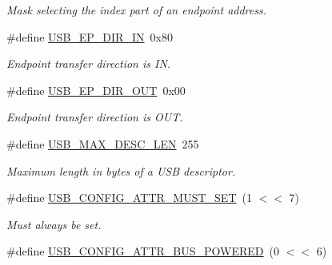 \begin{DoxyCompactItemize}
\begin{DoxyCompactList}\small\item\em Mask selecting the index part of an endpoint address. \end{DoxyCompactList}\item 
\hypertarget{group__usb__protocol__group_gaae8411e95f26738326bc25a0161dde99}{\#define \hyperlink{group__usb__protocol__group_gaae8411e95f26738326bc25a0161dde99}{U\-S\-B\-\_\-\-E\-P\-\_\-\-D\-I\-R\-\_\-\-I\-N}~0x80}\label{group__usb__protocol__group_gaae8411e95f26738326bc25a0161dde99}

\begin{DoxyCompactList}\small\item\em Endpoint transfer direction is I\-N. \end{DoxyCompactList}\item 
\hypertarget{group__usb__protocol__group_ga0510b0a04d9cef144e4d9793310abccf}{\#define \hyperlink{group__usb__protocol__group_ga0510b0a04d9cef144e4d9793310abccf}{U\-S\-B\-\_\-\-E\-P\-\_\-\-D\-I\-R\-\_\-\-O\-U\-T}~0x00}\label{group__usb__protocol__group_ga0510b0a04d9cef144e4d9793310abccf}

\begin{DoxyCompactList}\small\item\em Endpoint transfer direction is O\-U\-T. \end{DoxyCompactList}\item 
\#define \hyperlink{group__usb__protocol__group_ga27dacd4e0b04d4ef7b8aadf6ea886f3c}{U\-S\-B\-\_\-\-M\-A\-X\-\_\-\-D\-E\-S\-C\-\_\-\-L\-E\-N}~255
\begin{DoxyCompactList}\small\item\em Maximum length in bytes of a U\-S\-B descriptor. \end{DoxyCompactList}\item 
\hypertarget{group__usb__protocol__group_gac7063e965def0eaeb4d45a6f9048dc53}{\#define \hyperlink{group__usb__protocol__group_gac7063e965def0eaeb4d45a6f9048dc53}{U\-S\-B\-\_\-\-C\-O\-N\-F\-I\-G\-\_\-\-A\-T\-T\-R\-\_\-\-M\-U\-S\-T\-\_\-\-S\-E\-T}~(1 $<$$<$ 7)}\label{group__usb__protocol__group_gac7063e965def0eaeb4d45a6f9048dc53}

\begin{DoxyCompactList}\small\item\em Must always be set. \end{DoxyCompactList}\item 
\hypertarget{group__usb__protocol__group_ga10945c8d92454009444979c38b9d2cca}{\#define \hyperlink{group__usb__protocol__group_ga10945c8d92454009444979c38b9d2cca}{U\-S\-B\-\_\-\-C\-O\-N\-F\-I\-G\-\_\-\-A\-T\-T\-R\-\_\-\-B\-U\-S\-\_\-\-P\-O\-W\-E\-R\-E\-D}~(0 $<$$<$ 6)}\label{group__usb__protocol__group_ga10945c8d92454009444979c38b9d2cca}


\end{DoxyCompactItemize}
